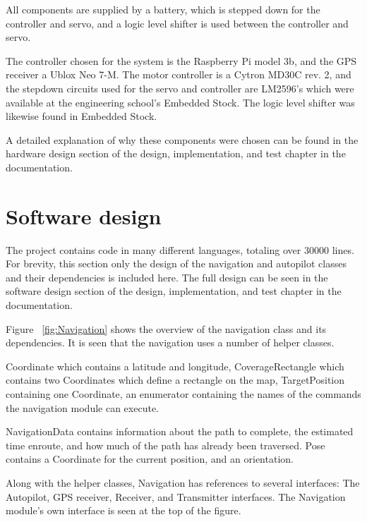 All components are supplied by a battery, which is stepped down for the controller and servo, and a logic level shifter is used between the controller and servo.

The controller chosen for the system is the Raspberry Pi model 3b, and the GPS receiver a Ublox Neo 7-M. The motor controller is a Cytron MD30C rev. 2, and the stepdown circuits used for the servo and controller are LM2596's which were available at the engineering school's Embedded Stock. The logic level shifter was likewise found in Embedded Stock.

A detailed explanation of why these components were chosen can be found in the hardware design section of the design, implementation, and test chapter in the documentation.

\section{Software design}
The project contains code in many different languages, totaling over 30000 lines. For brevity, this section only the design of the navigation and autopilot classes and their dependencies is included here. The full design can be seen in the software design section of the design, implementation, and test chapter in the documentation. 

Figure ~\ref{fig:Navigation} shows the overview of the navigation class and its dependencies. It is seen that the navigation uses a number of helper classes.

Coordinate which contains a latitude and longitude, CoverageRectangle which contains two Coordinates which define a rectangle on the map, TargetPosition containing one Coordinate, an enumerator containing the names of the commands the navigation module can execute.

NavigationData contains information about the path to complete, the estimated time enroute, and how much of the path has already been traversed. Pose contains a Coordinate for the current position, and an orientation. 

Along with the helper classes, Navigation has references to several interfaces: The Autopilot, GPS receiver, Receiver, and Transmitter interfaces. The Navigation module's own interface is seen at the top of the figure.

